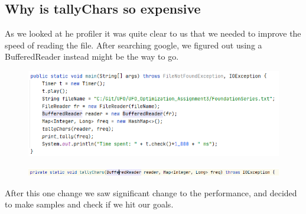 \documentclass[parskip=full]{scrartcl}
\begin{document}
\subsection{Why is tallyChars so expensive}
As we looked at he profiler it was quite clear to us that we needed to improve the speed of reading the file.
After searching google, we figured out using a BufferedReader instead might be the way to go.

\begin{figure}[!h]
    \centering
    \includegraphics[width=\textwidth]{changed_code2.PNG}
\end{figure}

\begin{figure}[!h]
    \centering
    \includegraphics[width=\textwidth]{changed_code1.PNG}
\end{figure}

After this one change we saw significant change to the performance, and decided to make samples and check if we hit our goals.
\clearpage
\end{document}
